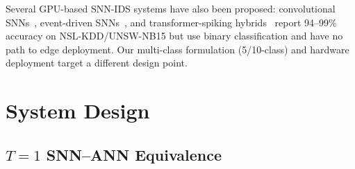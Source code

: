 \documentclass[conference]{IEEEtran}
\begin{document}
Several GPU-based SNN-IDS systems have also been proposed:
convolutional SNNs~\cite{nature2024csnn},
event-driven SNNs~\cite{ieee2025event}, and transformer-spiking
hybrids~\cite{nature2026transformer} report 94--99\% accuracy on
NSL-KDD/UNSW-NB15 but use binary classification and have no path
to edge deployment.
Our multi-class formulation (5/10-class) and hardware deployment
target a different design point.

\begin{table}[t]
\centering
\caption{Hardware-deployed IDS comparison. Energy is per inference.}
\label{tab:related}
\small
{}
\end{table}

\section{System Design}
\label{sec:system}

\subsection{$T{=}1$ SNN--ANN Equivalence}
\end{document}
